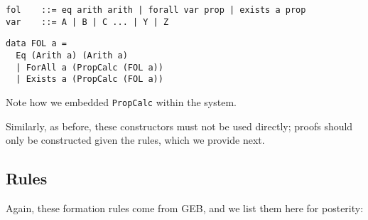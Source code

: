 \documentclass{article}
\begin{document}
\begin{minipage}{0.49\textwidth}
\begin{lstlisting}
fol    ::= eq arith arith | forall var prop | exists a prop
var    ::= A | B | C ... | Y | Z
\end{lstlisting}
\end{minipage}
\begin{minipage}{0.49\textwidth}
\begin{lstlisting}
data FOL a =
  Eq (Arith a) (Arith a)
  | ForAll a (PropCalc (FOL a))
  | Exists a (PropCalc (FOL a))
\end{lstlisting}
\end{minipage}

Note how we embedded \texttt{PropCalc} within the system.

Similarly, as before, these constructors must not be used directly; proofs should only be constructed given the rules, which we provide next.

\subsection{Rules}

Again, these formation rules come from GEB, and we list them here for posterity:
\end{document}
